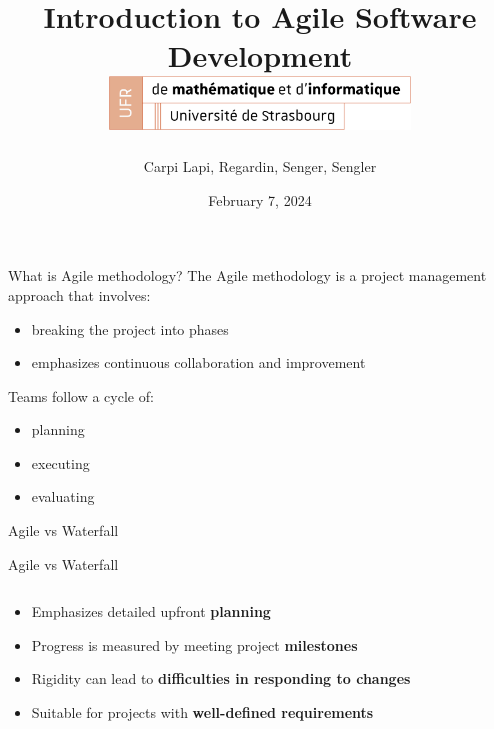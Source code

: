 \documentclass[10pt]{beamer}
\title[Introduction to Agile Software Development]{
  Introduction to Agile Software Development \\
  \vspace{1cm}
    \includegraphics[width=0.6\textwidth]{images/logo_Uni.png}}
\author[SuperAgile]{Carpi Lapi, Regardin, Senger, Sengler}
\date[February 7, 2024]{February 7, 2024}
\begin{document}
\frame{\titlepage}

\begin{frame}{What is Agile methodology?}
The Agile methodology is a project management approach that involves:
\begin{itemize}
    \item breaking the project into phases
    \item emphasizes continuous collaboration and improvement \\
    \vspace{1cm}
\end{itemize}

Teams follow a cycle of: 
\begin{itemize}
    \item planning
    \item executing
    \item evaluating
\end{itemize}

\end{frame}

\begin{frame}{Agile vs Waterfall}
  \vspace{0.5cm}
\end{frame}

\begin{frame}{Agile vs Waterfall}
  \vspace{0.5cm}
  \begin{columns}[T]

    \begin{column}{0.5\textwidth}
      \vspace{2cm}
      \begin{itemize}
        \item<2-> Emphasizes detailed upfront \textbf{planning}
        \item<3-> Progress is measured by meeting project \textbf{milestones}
        \item<4-> Rigidity can lead to \textbf{difficulties in responding to changes}
        \item<5-> Suitable for projects with \textbf{well-defined requirements}
      \end{itemize}
    \end{column}

    \begin{column}{0.5\textwidth}
    \end{column}

  \end{columns}
\end{frame}
\end{document}
